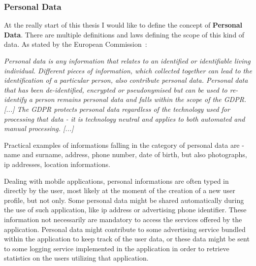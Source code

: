 	\subsubsection{Personal Data}
		\par At the really start of this thesis I would like to define the concept of \textbf{Personal Data}. There are multiple definitions and laws defining the scope of this kind of data. As stated by the European Commission~\cite{European Commission}:
		\begin{framed}
			\textit{
				Personal data is any information that relates to an identified or identifiable living individual. Different pieces of information, which collected together can lead to the identification of a particular person, also contribute personal data. \newline
				\indent Personal data that has been de-identified, encrypted or pseudonymised but can be used to re-identify a person remains personal data and falls within the scope of the GDPR. [...] \newline
				\indent The GDPR protects personal data regardless of the technology used for processing that data - it is technology neutral and applies to both automated and manual processing. [...]
			}
		\end{framed}
		\par Practical examples of informations falling in the category of personal data are - name and surname, address, phone number, date of birth, but also photographs, ip addresses, location informations. \newline
		\par Dealing with mobile applications, personal informations are often typed in directly by the user, most likely at the moment of the creation of a new user profile, but not only. Some personal data might be shared automatically during the use of such application, like ip address or advertising phone identifier. \newline
		These information not necessarily are mandatory to access the services offered by the application. Personal data might contribute to some advertising service bundled within the application to keep track of the user data, or these data might be sent to some logging service implemented in the application in order to retrieve statistics on the users utilizing that application. 
	
